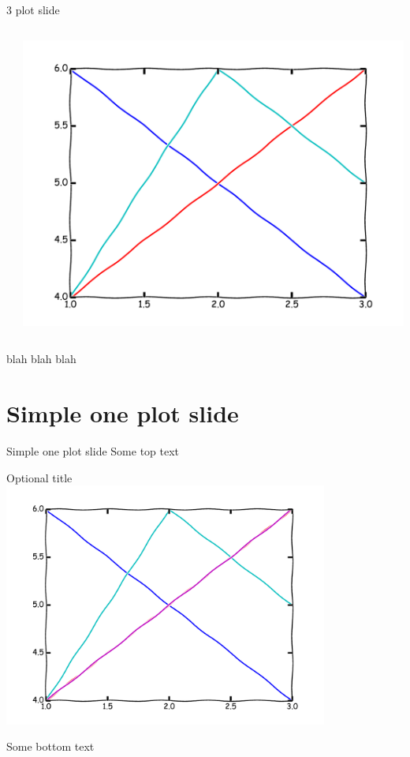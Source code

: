 \begin{frame}{3 plot slide}
\begin{columns}
\begin{column}{0.33\textwidth}
\begin{center}
\\
\end{center}
\end{column}
\begin{column}{0.33\textwidth}
\begin{center}
\includegraphics[width=\textwidth]{example/plot4.pdf}
\\
\end{center}
\end{column}
\end{columns}
blah blah blah
\end{frame}

\section{Simple one plot slide}
\begin{frame}{Simple one plot slide}
Some top text
\begin{center}
Optional title
\\
\includegraphics[width=0.8\textwidth]{example/plot1.pdf}
\\
\end{center}
Some bottom text
\end{frame}

